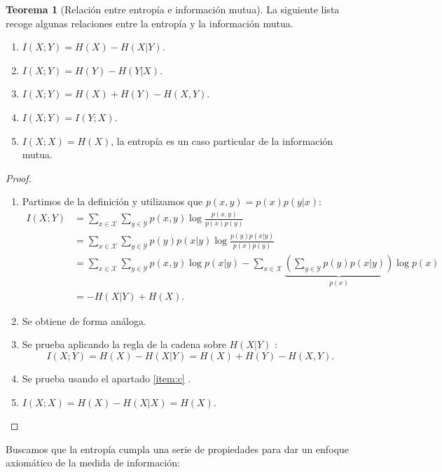 \documentclass[10pt,a4paper]{article} %
\theoremstyle{definition}
\newtheorem{theorem}{Teorema}[section]
\newtheorem{example}[theorem]{Ejemplo}
\begin{document}

\begin{theorem}[Relación entre entropía e información mutua] La siguiente lista recoge algunas relaciones entre la entropía y la información mutua.
\begin{enumerate}[label={\alph*)}]
  \item $I(X;Y) = H(X) - H(X|Y)$.
  \item $I(X;Y) = H(Y) - H(Y|X)$.
  \item $I(X;Y) = H(X) + H(Y) - H(X,Y)$.
  \item $I(X;Y) = I(Y;X)$.
    \item $I(X;X) = H(X)$, la entropía es un caso particular de la información mutua.
  \end{enumerate}
\end{theorem}
\begin{proof}\hfill\\
   \begin{enumerate}[label={\alph*)}]
   \item Partimos de la definición y utilizamos que $p(x,y) = p(x)p(y|x)$:
     \begin{align*}
       I(X;Y) &= \sum_{x \in \mathcal{X}}\sum_{y \in \mathcal{Y}}p(x,y) \log \frac{p(x,y)}{p(x)p(y)}\\
       &= \sum_{x \in \mathcal{X}}\sum_{y \in \mathcal{Y}} p(y) p(x|y) \log \frac{p(y)p(x|y)}{p(x)p(y)}\\
    &= \sum_{x \in \mathcal{X}}\sum_{y \in \mathcal{Y}} p(x,y) \log p(x|y) -\!\!\sum_{x \in \mathcal{X}}\underbrace{\left ( \sum_{y \in \mathcal{Y}} p(y) p(x|y) \right)}_{p(x)} \log p(x)\\
    &= - H(X|Y) + H(X).
  \end{align*}
\item Se obtiene de forma análoga.
\item \label{item:c}
  Se prueba aplicando la regla de la cadena sobre $H(X|Y)$ :\[I(X;Y) = H(X) - H(X|Y) = H(X) + H(Y) - H(X,Y).\]
\item Se prueba usando el apartado \ref{item:c}
  .
\item $I(X;X) = H(X) - H(X|X) = H(X)$.
\end{enumerate}
\end{proof}

Buscamos que la entropía cumpla una serie de propiedades para dar un enfoque axiomático de la medida de información:
\end{document}
